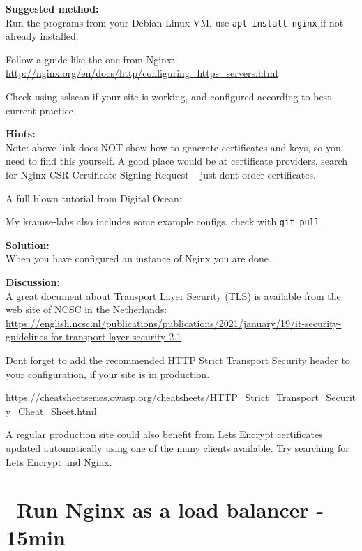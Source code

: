 \documentclass[a4paper,11pt,notitlepage]{report}
\begin{document}
{\bf Suggested method:}\\
Run the programs from your Debian Linux VM, use \verb+apt install nginx+ if not already installed.

Follow a guide like the one from Nginx:\\
\url{http://nginx.org/en/docs/http/configuring_https_servers.html}

Check using sslscan if your site is working, and configured according to best current practice.

{\bf Hints:}\\
Note: above link does NOT show how to generate certificates and keys, so you need to find this yourself. A good place would be at certificate providers, search for Nginx CSR Certificate Signing Request -- just dont order certificates.

A full blown tutorial from Digital Ocean:\\

My kramse-labs also includes some example configs, check with \verb+git pull+

{\bf Solution:}\\
When you have configured an instance of Nginx you are done.

{\bf Discussion:}\\
A great document about Transport Layer Security (TLS) is available from the web site of NCSC in the Netherlands:\\
{\scriptsize\url{https://english.ncsc.nl/publications/publications/2021/january/19/it-security-guidelines-for-transport-layer-security-2.1}}

Dont forget to add the recommended HTTP Strict Transport Security header to your configuration, if your site is in production.

{\footnotesize\url{https://cheatsheetseries.owasp.org/cheatsheets/HTTP_Strict_Transport_Security_Cheat_Sheet.html}}

A regular production site could also benefit from Lets Encrypt certificates updated automatically using one of the many clients available. Try searching for Lets Encrypt and Nginx.

\chapter{\faInfoCircle\ Run Nginx as a load balancer - 15min}
\label{ex:nginx-loadbalancer}
\end{document}
